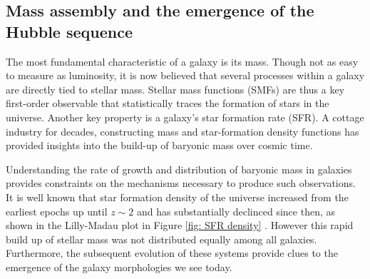 
\subsection{Mass assembly and the emergence of the Hubble sequence}
The most fundamental characteristic of a galaxy is its mass. Though not as easy to measure as luminosity, it is now believed that several processes within a galaxy are directly tied to stellar mass. Stellar mass functions (SMFs) are thus a key first-order observable that statistically traces the formation of stars in the universe. Another key property is a galaxy's star formation rate (SFR).  A cottage industry for decades, constructing mass and star-formation density functions has provided insights into the build-up of baryonic mass over cosmic time. 

Understanding the rate of growth and distribution of baryonic mass in galaxies provides constraints on the mechanisms necessary to produce such observations. It is well known that star formation density of the universe increased from the earliest epochs up until $z\sim2$ and has substantially declinced since then, as shown in the Lilly-Madau plot in Figure \ref{fig: SFR density} \citep[and references therein]{Madau2014}.  However this rapid build up of stellar mass was not distributed equally among all galaxies. Furthermore, the subsequent evolution of these systems provide clues to the emergence of the galaxy morphologies we see today. 

